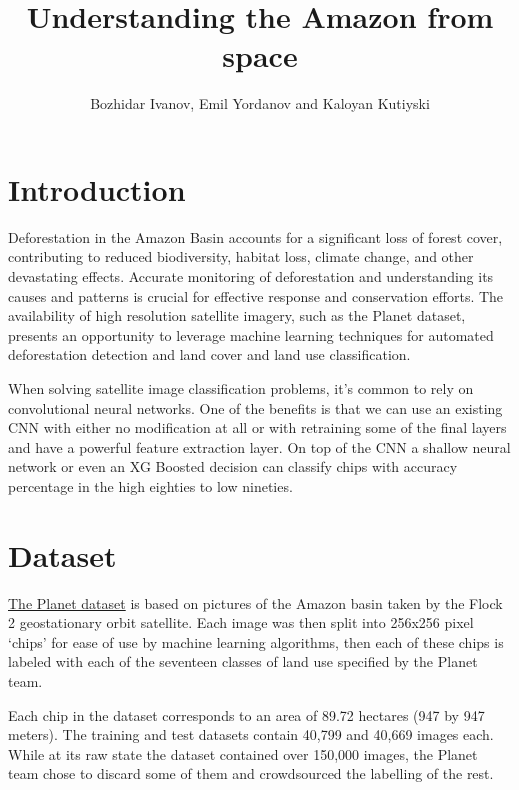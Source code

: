 \documentclass[
	a4paper, %
	10pt, %
	unnumberedsections, %
	twoside, %
]{LTJournalArticle}
\title{Understanding the Amazon from space} %
\author{%
	Bozhidar Ivanov, Emil Yordanov and Kaloyan Kutiyski
}
\begin{document}
\maketitle %


\section{Introduction}

Deforestation in the Amazon Basin accounts for a significant loss of forest cover, contributing to reduced biodiversity, habitat loss, climate change, and other devastating effects. Accurate monitoring of deforestation and understanding its causes and patterns is crucial for effective response and conservation efforts. The availability of high resolution satellite imagery, such as the Planet dataset, presents an opportunity to leverage machine learning techniques for automated deforestation detection and land cover and land use classification.



When solving satellite image classification problems, it’s common to rely on convolutional neural networks. One of the benefits is that we can use an existing CNN with either no modification at all or with retraining some of the final layers and have a powerful feature extraction layer. On top of the CNN a shallow neural network or even an XG Boosted decision can classify chips with accuracy percentage in the high eighties to low nineties.


\section{Dataset}

\href{https://www.kaggle.com/competitions/planet-understanding-the-amazon-from-space/data}{The Planet dataset} is based on pictures of the Amazon basin taken by the Flock 2 geostationary orbit satellite. Each image was then split into 256x256 pixel ‘chips’ for ease of use by machine learning algorithms, then each of these chips is labeled with each of the seventeen classes of land use specified by the Planet team.

Each chip in the dataset corresponds to an area of 89.72 hectares (947 by 947 meters). The training and test datasets contain 40,799 and 40,669 images each. While at its raw state the dataset contained over 150,000 images, the Planet team chose to discard some of them and crowdsourced the labelling of the rest. 
\end{document}
